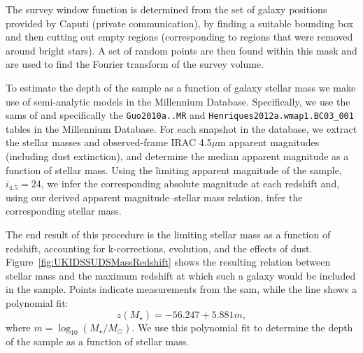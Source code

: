 The survey window function is determined from the set of galaxy positions provided by Caputi (private communication), by finding a suitable bounding box and then cutting out empty regions (corresponding to regions that were removed around bright stars). A set of random points are then found within this mask and are used to find the Fourier transform of the survey volume. 

To estimate the depth of the \cite{caputi_stellar_2011} sample as a function of galaxy stellar mass we make use of semi-analytic models in the Millennium Database. Specifically, we use the \glspl{sam} of \cite{guo_dwarf_2011} and \cite{henriques_confronting_2012} specifically the {\tt Guo2010a..MR} and {\tt Henriques2012a.wmap1.BC03\_001} tables in the Millennium Database. For each snapshot in the database, we extract the stellar masses and observed-frame IRAC 4.5$\mu$m apparent magnitudes (including dust extinction), and determine the median apparent magnitude as a function of stellar mass. Using the limiting apparent magnitude of the \cite{caputi_stellar_2011} sample, $i_{4.5}=24$, we infer the corresponding absolute magnitude at each redshift and, using our derived apparent magnitude--stellar mass relation, infer the corresponding stellar mass.

The end result of this procedure is the limiting stellar mass as a function of redshift, accounting for k-corrections, evolution, and the effects of dust. Figure~\ref{fig:UKIDSSUDSMassRedshift} shows the resulting relation between stellar mass and the maximum redshift at which such a galaxy would be included in the sample. Points indicate measurements from the \gls{sam}, while the line shows a polynomial fit:
\begin{equation}
 z(M_\star) = -56.247 + 5.881 m,
 \label{eq:UKIDSSUDSDepthPolynomial}
\end{equation}
where $m= \log_{10}(M_\star/M_\odot)$. We use this polynomial fit to determine the depth of the sample as a function of stellar mass.

